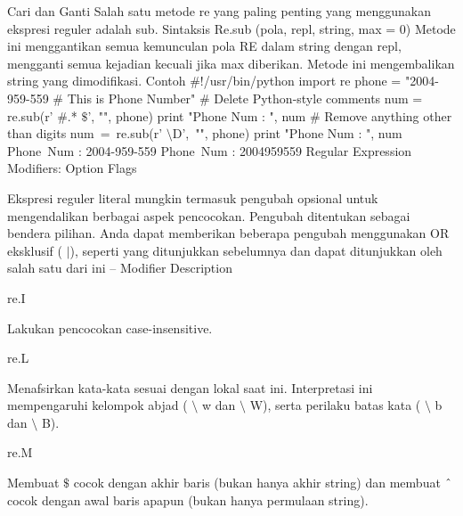 \begin {enumerate}
\begin {enumerate}
Cari dan Ganti
\vspace{12pt}
\noindent
Salah satu metode re yang paling penting yang menggunakan ekspresi reguler adalah sub.
\noindent
Sintaksis
\vspace{12pt}
Re.sub (pola, repl, string, max = 0)
\vspace{12pt}
\noindent
Metode ini menggantikan semua kemunculan pola RE dalam string dengan repl, mengganti semua kejadian kecuali jika max diberikan. Metode ini mengembalikan string yang dimodifikasi.
Contoh
\noindent
 $  \#  $!/usr/bin/python
\noindent
import re
\vspace{12pt}
\noindent
phone = "2004-959-559  $  \#  $ This is Phone Number" 
\vspace{12pt}
\noindent
 $  \#  $ Delete Python-style comments
\noindent
num = re.sub(r' $  \#  $.* $  \$  $', "", phone)
\noindent
print "Phone Num : ", num
\vspace{12pt}
\noindent
 $  \#  $ Remove anything other than digits
\noindent
num~=~re.sub(r' $  \setminus  $D',~"", phone)
\noindent
print "Phone Num : ", num
\vspace{12pt}
\noindent
Phone~Num :  2004-959-559
\noindent
Phone~Num :  2004959559
\vspace{12pt}
\noindent
Regular Expression Modifiers: Option Flags \par
Ekspresi reguler literal mungkin termasuk pengubah opsional untuk mengendalikan berbagai aspek pencocokan. Pengubah ditentukan sebagai bendera pilihan. Anda dapat memberikan beberapa pengubah menggunakan OR eksklusif ( $  \vert  $), seperti yang ditunjukkan sebelumnya dan dapat ditunjukkan oleh salah satu dari ini – Modifier Description  \par
\noindent
re.I \hspace*{0.5in}  \par
\noindent
Lakukan pencocokan case-insensitive. \par
\vspace{12pt}
\noindent
re.L \hspace*{0.5in}  \par
\noindent
Menafsirkan kata-kata sesuai dengan lokal saat ini. Interpretasi ini mempengaruhi kelompok abjad ( $  \setminus  $ w dan  $  \setminus  $ W), serta perilaku batas kata ( $  \setminus  $ b dan  $  \setminus  $ B). \par
\vspace{12pt}
\noindent
re.M \hspace*{0.5in}  \par
\noindent
Membuat  $  \$  $ cocok dengan akhir baris (bukan hanya akhir string) dan membuat  $  \string^  $ cocok dengan awal baris apapun (bukan hanya permulaan string). \par

\end{enumerate}
\end{enumerate}
